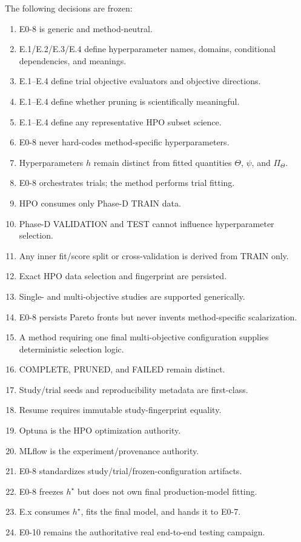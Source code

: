 \documentclass[11pt]{article}
\begin{document}
The following decisions are frozen:
\begin{enumerate}[label=\arabic*.]
\item E0-8 is generic and method-neutral.
\item E.1/E.2/E.3/E.4 define hyperparameter names, domains, conditional dependencies, and meanings.
\item E.1--E.4 define trial objective evaluators and objective directions.
\item E.1--E.4 define whether pruning is scientifically meaningful.
\item E.1--E.4 define any representative HPO subset science.
\item E0-8 never hard-codes method-specific hyperparameters.
\item Hyperparameters $h$ remain distinct from fitted quantities $\Theta$, $\psi$, and $\Pi_\Theta$.
\item E0-8 orchestrates trials; the method performs trial fitting.
\item HPO consumes only Phase-D TRAIN data.
\item Phase-D VALIDATION and TEST cannot influence hyperparameter selection.
\item Any inner fit/score split or cross-validation is derived from TRAIN only.
\item Exact HPO data selection and fingerprint are persisted.
\item Single- and multi-objective studies are supported generically.
\item E0-8 persists Pareto fronts but never invents method-specific scalarization.
\item A method requiring one final multi-objective configuration supplies deterministic selection logic.
\item COMPLETE, PRUNED, and FAILED remain distinct.
\item Study/trial seeds and reproducibility metadata are first-class.
\item Resume requires immutable study-fingerprint equality.
\item Optuna is the HPO optimization authority.
\item MLflow is the experiment/provenance authority.
\item E0-8 standardizes study/trial/frozen-configuration artifacts.
\item E0-8 freezes $h^{\star}$ but does not own final production-model fitting.
\item E.x consumes $h^{\star}$, fits the final model, and hands it to E0-7.
\item E0-10 remains the authoritative real end-to-end testing campaign.
\end{enumerate}



\end{document}
